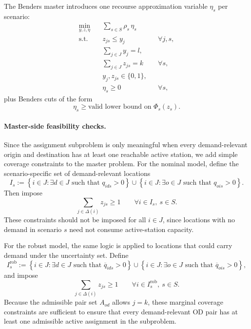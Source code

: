 \documentclass[11pt]{article}
\theoremstyle{definition}
\begin{document}
The Benders master introduces one recourse approximation variable \(\eta_s\) per
scenario:
\begin{equation}
	\begin{aligned}
		\min_{y,z,\eta}\quad
		 & \sum_{s\in S}\rho_s\,\eta_s                   \\
		\text{s.t.}\quad
		 & z_{js}\le y_j               &  & \forall j,s, \\
		 & \sum_{j\in J} y_j = l,                        \\
		 & \sum_{j\in J} z_{js} = k    &  & \forall s,   \\
		 & y_j,z_{js}\in\{0,1\},                         \\
		 & \eta_s \ge 0                &  & \forall s,
	\end{aligned}
	\label{eq:benders-master-nominal}
\end{equation}
plus Benders cuts of the form
\[
	\eta_s \ge \text{valid lower bound on } \Phi_s(z_s).
\]

\paragraph{Master-side feasibility checks.}
Since the assignment subproblem is only meaningful when every demand-relevant
origin and destination has at least one reachable active station, we add simple
coverage constraints to the master problem.  For the nominal model, define the
scenario-specific set of demand-relevant locations
\[
	I_s
	:=
	\left\{
	i\in J:\exists d\in J \text{ such that } q_{ids}>0
	\right\}
	\cup
	\left\{
	i\in J:\exists o\in J \text{ such that } q_{ois}>0
	\right\}.
\]
Then impose
\begin{equation}
	\sum_{j\in \Delta(i)} z_{js}\ge 1
	\qquad \forall i\in I_s,\ s\in S.
	\label{eq:benders-nominal-feasibility-check}
\end{equation}
These constraints should not be imposed for all \(i\in J\), since locations
with no demand in scenario \(s\) need not consume active-station capacity.

For the robust model, the same logic is applied to locations that could carry
demand under the uncertainty set.  Define
\[
	I_s^{\mathrm{rob}}
	:=
	\left\{
	i\in J:\exists d\in J \text{ such that } \overline q_{ids}>0
	\right\}
	\cup
	\left\{
	i\in J:\exists o\in J \text{ such that } \overline q_{ois}>0
	\right\},
\]
and impose
\begin{equation}
	\sum_{j\in \Delta(i)} z_{js}\ge 1
	\qquad \forall i\in I_s^{\mathrm{rob}},\ s\in S.
	\label{eq:benders-robust-feasibility-check}
\end{equation}
Because the admissible pair set \(A_{od}\) allows \(j=k\), these marginal
coverage constraints are sufficient to ensure that every demand-relevant OD pair
has at least one admissible active assignment in the subproblem.
\end{document}
